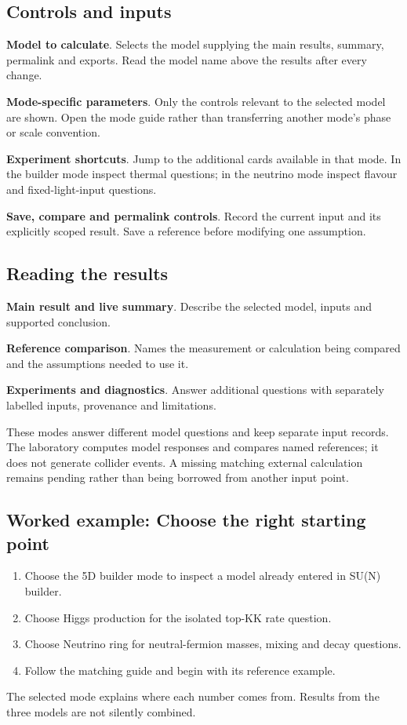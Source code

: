 \documentclass[11pt,a4paper]{article}
\begin{document}
\subsection*{Controls and inputs}
\textbf{Model to calculate}. Selects the model supplying the main results, summary, permalink and exports. Read the model name above the results after every change.

\textbf{Mode-specific parameters}. Only the controls relevant to the selected model are shown. Open the mode guide rather than transferring another mode's phase or scale convention.

\textbf{Experiment shortcuts}. Jump to the additional cards available in that mode. In the builder mode inspect thermal questions; in the neutrino mode inspect flavour and fixed-light-input questions.

\textbf{Save, compare and permalink controls}. Record the current input and its explicitly scoped result. Save a reference before modifying one assumption.

\subsection*{Reading the results}
\textbf{Main result and live summary}. Describe the selected model, inputs and supported conclusion.

\textbf{Reference comparison}. Names the measurement or calculation being compared and the assumptions needed to use it.

\textbf{Experiments and diagnostics}. Answer additional questions with separately labelled inputs, provenance and limitations.

These modes answer different model questions and keep separate input records. The laboratory computes model responses and compares named references; it does not generate collider events. A missing matching external calculation remains pending rather than being borrowed from another input point.
\subsection*{Worked example: Choose the right starting point}
\begin{enumerate}
\item Choose the 5D builder mode to inspect a model already entered in SU(N) builder.
\item Choose Higgs production for the isolated top-KK rate question.
\item Choose Neutrino ring for neutral-fermion masses, mixing and decay questions.
\item Follow the matching guide and begin with its reference example.
\end{enumerate}
The selected mode explains where each number comes from. Results from the three models are not silently combined.
\end{document}
